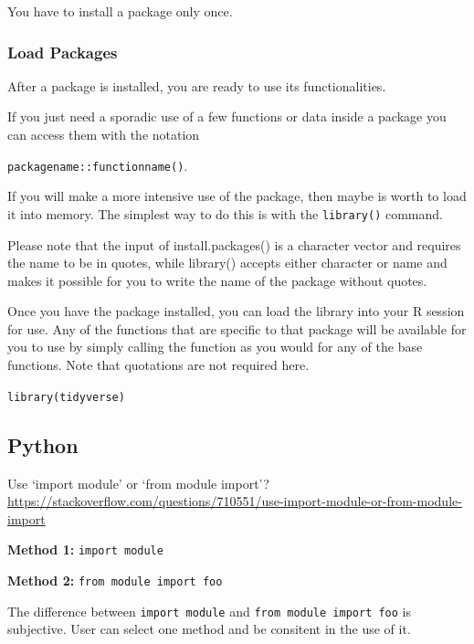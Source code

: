 \documentclass[]{book}
\begin{document}
You have to install a package only once.

\hypertarget{load-packages}{%
\subsubsection{Load Packages}\label{load-packages}}

After a package is installed, you are ready to use its functionalities.

If you just need a sporadic use of a few functions or data inside a package you can access them with the notation

\texttt{packagename::functionname()}.

If you will make a more intensive use of the package, then maybe is worth to load it into memory. The simplest way to do this is with the \texttt{library()} command.

Please note that the input of install.packages() is a character vector and requires the name to be in quotes, while library() accepts either character or name and makes it possible for you to write the name of the package without quotes.

Once you have the package installed, you can load the library into your R session for use. Any of the functions that are specific to that package will be available for you to use by simply calling the function as you would for any of the base functions. Note that quotations are not required here.

\texttt{library(tidyverse)}

\hypertarget{python-4}{%
\subsection{Python}\label{python-4}}

Use `import module' or `from module import'? \url{https://stackoverflow.com/questions/710551/use-import-module-or-from-module-import}

\textbf{Method 1:} \texttt{import\ module}

\textbf{Method 2:} \texttt{from\ module\ import\ foo}

The difference between \texttt{import\ module} and \texttt{from\ module\ import\ foo} is subjective. User can select one method and be consitent in the use of it.
\end{document}
